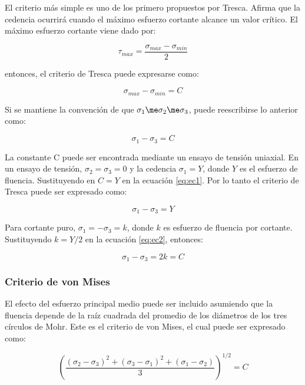 El criterio más simple es uno de los primero propuestos por Tresca. Afirma que la cedencia 
ocurrirá cuando el máximo esfuerzo cortante alcance un valor crítico. El máximo esfuerzo 
cortante viene dado por:

\begin{equation}
\tau_{max} = \frac{\sigma_{max}-\sigma_{min}}{2}
\end{equation}

entonces, el criterio de Tresca puede expresarse como:

\begin{equation}
\sigma_{max} - \sigma_{min} = C
\end{equation}

Si se mantiene la convención de que $ \sigma_1 \me \sigma_2 \me \sigma_3 $, puede reescribirse lo anterior como:

\begin{equation}\label{eq:ec1}
\sigma_1 - \sigma_3 = C
\end{equation}

La constante C puede ser encontrada mediante un ensayo de tensión uniaxial. En un ensayo de tensión, 
$\sigma_2 = \sigma_3 = 0$ y la cedencia $\sigma_1 = Y$, donde $Y$ es el esfuerzo de fluencia. Sustituyendo 
en $C=Y$ en la ecuación \ref{eq:ec1}. Por lo tanto el criterio de Tresca puede ser expresado como:

\begin{equation}\label{eq:ec2}
\sigma_1 - \sigma_3 = Y
\end{equation}

Para cortante puro, $ \sigma_1 = -\sigma_3 = k$, donde $k$ es esfuerzo de fluencia por cortante. Sustituyendo 
$ k = Y/2 $ en la ecuación \ref{eq:ec2}, entonces:

\begin{equation}
\sigma_1 - \sigma_3 = 2k = C
\end{equation}

\subsubsection{Criterio de von Mises}

El efecto del esfuerzo principal medio puede ser incluido asumiendo que la fluencia depende de la raíz cuadrada 
del promedio de los diámetros de los tres círculos de Mohr. Este es el criterio de von Mises, el cual puede ser 
expresado como:

\begin{equation} \label{eq:ec3}
\left( \frac{ (\sigma_2-\sigma_3)^2 + (\sigma_3-\sigma_1 )^2 + (\sigma_1-\sigma_2)}{3} \right) ^{1/2} = C
\end{equation}

